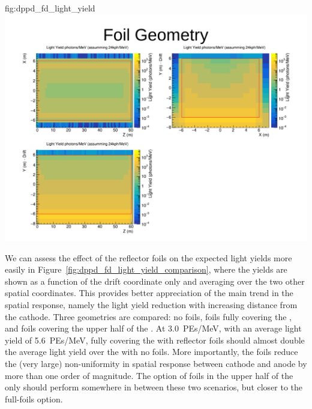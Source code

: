 \begin{dunefigure}{fig:dppd_fd_light_yield}
\includegraphics[trim={14cm 9.5cm 1cm 3.5cm}, clip, height=0.22\textheight]{graphics/dppd_fd_light_yield_fullfoil.pdf}
\end{dunefigure}

We can assess the effect of the  reflector foils on the expected light yields more easily in Figure~\ref{fig:dppd_fd_light_yield_comparison}, where the yields are shown as a function of the drift coordinate only and averaging over the two other spatial coordinates. This provides better appreciation of the main trend in the spatial response, namely the light yield reduction with increasing distance from the cathode. Three geometries are compared: no foils, foils fully covering the , and foils covering the upper half of the . At \SI{3.0}{PEs/MeV}, with an average light yield of \SI{5.6}{PEs/MeV}, fully covering the  with  reflector foils should almost double the average light yield over the  with no foils. More importantly, the foils reduce the (very large) non-uniformity in spatial response between cathode and anode by more than one order of magnitude. The option of foils in the upper half of the  only should perform somewhere in between these two scenarios, but closer to the full-foils option.

